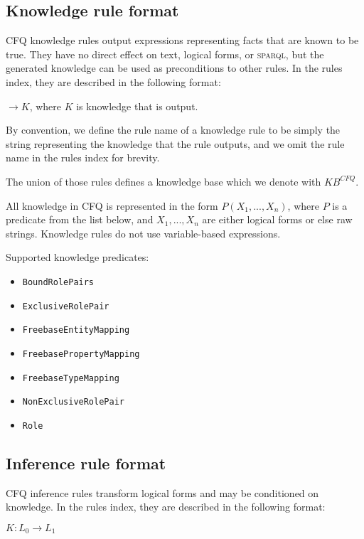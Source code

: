 \documentclass[letterpaper]{article}
\newcommand{\SPARQL}{\textsc{sparql}}
\begin{document}
\subsection{Knowledge rule format}

CFQ knowledge rules output expressions representing facts that are known to be true. They have no direct effect on text, logical forms, or \SPARQL{}, but the generated knowledge can be used as preconditions to other rules. In the rules index, they are described in the following format:

\begin{flushleft}
$\rightarrow K$, where $K$ is knowledge that is output.
\end{flushleft}

By convention, we define the rule name of a knowledge rule to be simply the string representing the knowledge that the rule outputs, and we omit the rule name in the rules index for brevity.

The union of those rules defines a knowledge base which we denote with $KB^{CFQ}$.

All knowledge in CFQ is represented in the form $P(X_1,...,X_n)$, where $P$ is a predicate from the list below, and $X_1, ..., X_n$ are either logical forms or else raw strings. Knowledge rules do not use variable-based expressions.

Supported knowledge predicates:
\begin{itemize}
\item \texttt{BoundRolePairs}
\item \texttt{ExclusiveRolePair}
\item \texttt{FreebaseEntityMapping}
\item \texttt{FreebasePropertyMapping}
\item \texttt{FreebaseTypeMapping}
\item \texttt{NonExclusiveRolePair}
\item \texttt{Role}
\end{itemize}

\subsection{Inference rule format}

CFQ inference rules transform logical forms and may be conditioned on knowledge. In the rules index, they are described in the following format:

\begin{flushleft}
$K: L_0 \rightarrow L_1$
\end{flushleft}
\end{document}
